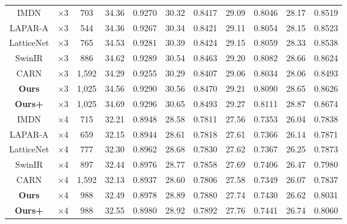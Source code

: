 \documentclass[default,iicol]{sn-jnl}
\theoremstyle{thmstyleone}\newtheorem{theorem}{Theorem}\newtheorem{proposition}[theorem]{Proposition}
\theoremstyle{thmstyletwo}\newtheorem{example}{Example}\newtheorem{remark}{Remark}\theoremstyle{thmstylethree}\newtheorem{definition}{Definition}
\begin{document}
\begin{table*}
{\begin{tabular}{ccccccccccc}
IMDN\cite{hui2019lightweight} & $\times$3 & 703 & 34.36 & 0.9270 & 30.32 & 0.8417 & 29.09 & 0.8046 & 28.17 & 0.8519 \\
LAPAR-A\cite{li2020lapar} & $\times$3 & 544 & 34.36 & 0.9267 & 30.34 & 0.8421 & 29.11 & 0.8054 & 28.15 & 0.8523 \\
LatticeNet\cite{luo2020latticenet} & $\times$3 & 765 & 34.53 & 0.9281 & 30.39 & 0.8424 & 29.15 & 0.8059 & 28.33 & 0.8538 \\
SwinIR\cite{liang2021swinir} & $\times$3 & 886 & {\color{blue}34.62} & 0.9289 & 30.54 & 0.8463 & 29.20 & 0.8082 & {\color{blue}28.66} & 0.8624 \\
CARN\cite{ahn2018fast} & $\times$3 & 1,592 & 34.29 & 0.9255 & 30.29 & 0.8407 & 29.06 & 0.8034 & 28.06 & 0.8493 \\
\textbf{Ours} & $\times$3 & 1,025 & 34.56 & {\color{blue}0.9290} & {\color{blue}30.56} & {\color{blue}0.8470} & {\color{blue}29.21} & {\color{blue}0.8090} & 28.65 & {\color{blue}0.8626} \\
\textbf{Ours+} & $\times$3 & 1,025 & {\color{red}34.69} & {\color{red}0.9296} & {\color{red}30.65} & {\color{red}0.8493} & {\color{red}29.27} & {\color{red}0.8111} & {\color{red}28.87} & {\color{red}0.8674} \\ \hline
IMDN\cite{hui2019lightweight} & $\times$4 & 715 & 32.21 & 0.8948 & 28.58 & 0.7811 & 27.56 & 0.7353 & 26.04 & 0.7838 \\
LAPAR-A\cite{li2020lapar} & $\times$4 & 659 & 32.15 & 0.8944 & 28.61 & 0.7818 & 27.61 & 0.7366 & 26.14 & 0.7871 \\
LatticeNet\cite{luo2020latticenet} & $\times$4 & 777 & 32.30 & 0.8962 & 28.68 & 0.7830 & 27.62 & 0.7367 & 26.25 & 0.7873 \\
SwinIR\cite{liang2021swinir} & $\times$4 & 897 & 32.44 & 0.8976 & 28.77 & 0.7858 & 27.69 & 0.7406 & 26.47 & 0.7980 \\
CARN\cite{ahn2018fast} & $\times$4 & 1,592 & 32.13 & 0.8937 & 28.60 & 0.7806 & 27.58 & 0.7349 & 26.07 & 0.7837 \\
\textbf{Ours} & $\times$4 & 988 & {\color{blue}32.49} & {\color{blue}0.8978} & {\color{blue}28.89} & {\color{blue}0.7880} & {\color{blue}27.74} & {\color{blue}0.7430} & {\color{blue}26.62} & {\color{blue}0.8031} \\
\textbf{Ours+} & $\times$4 & 988 & {\color{red}32.55} & {\color{red}0.8980} & {\color{red}28.92} & {\color{red}0.7892} & {\color{red}27.76} & {\color{red}0.7441} & {\color{red}26.74} & {\color{red}0.8060} \\ \hline
\end{tabular}}
\end{table*}
\end{document}
